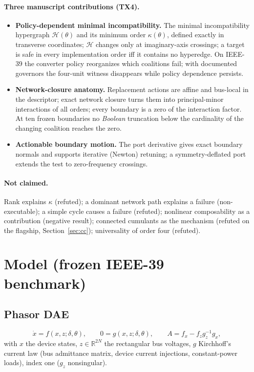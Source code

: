 \documentclass[10pt,a4paper]{article}
\theoremstyle{definition}
\newcommand{\Hy}{\mathcal{H}}
\begin{document}
\paragraph{Three manuscript contributions (TX4).}
\begin{itemize}
\item[\textbf{C1}] \textbf{Policy-dependent minimal incompatibility.} The minimal incompatibility
hypergraph $\Hy(\theta)$ and its minimum order $\kappa(\theta)$, defined exactly in transverse
coordinates; $\Hy$ changes only at imaginary-axis crossings; a target is safe in every
implementation order iff it contains no hyperedge. On IEEE-39 the converter policy reorganizes
which coalitions fail; with documented governors the four-unit witness disappears while
policy dependence persists.
\item[\textbf{C2}] \textbf{Network-closure anatomy.} Replacement actions are affine and bus-local in the
descriptor; exact network closure turns them into principal-minor interactions of all orders;
every boundary is a zero of the interaction factor. At ten frozen boundaries no
\emph{Boolean} truncation below the cardinality of the changing coalition reaches the zero.
\item[\textbf{C3}] \textbf{Actionable boundary motion.} The port derivative gives exact boundary normals and
supports iterative (Newton) retuning; a symmetry-deflated port extends the test to
zero-frequency crossings.
\end{itemize}

\paragraph{Not claimed.} Rank explains $\kappa$ (refuted); a dominant network path explains a failure
(non-executable); a simple cycle causes a failure (refuted); nonlinear composability as a
contribution (negative result); connected cumulants as the mechanism (refuted on the flagship,
Section~\ref{sec:cc}); universality of order four (refuted).

\section{Model (frozen IEEE-39 benchmark)}\label{sec:model}

\subsection{Phasor DAE}
\begin{equation}
\dot x=f(x,z;\delta,\theta),\qquad 0=g(x,z;\delta,\theta),\qquad A=f_x-f_z g_z^{-1}g_x ,
\end{equation}
with $x$ the device states, $z\in\mathbb{R}^{2N}$ the rectangular bus voltages, $g$ Kirchhoff's
current law (bus admittance matrix, device current injections, constant-power loads), index one
($g_z$ nonsingular).
\end{document}

